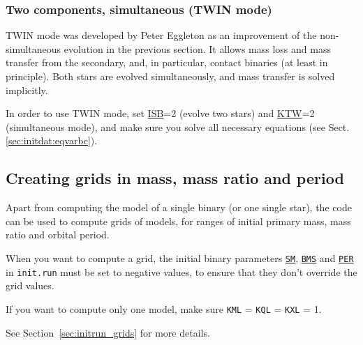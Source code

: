 \subsubsection{Two components, simultaneous (TWIN mode)}

TWIN mode was developed by Peter Eggleton as an improvement of the non-simultaneous evolution in the previous section.
It allows mass loss and mass transfer from the secondary, and, in particular, contact binaries (at least in principle).
Both stars are evolved simultaneously, and mass transfer is solved implicitly.  

In order to use TWIN mode, set \hyperlink{isb}{ISB}=2 (evolve two stars) and \hyperlink{ktw}{KTW}=2 (simultaneous mode),
and make sure you solve all necessary equations (see Sect.\,\ref{sec:initdat:eqvarbc}).



\subsection{Creating grids in mass, mass ratio and period}


Apart from computing the model of a single binary (or one single star), the code can be used to compute grids of models,
for ranges of initial primary mass, mass ratio and orbital period.  

When you want to compute a grid, the initial binary parameters \hyperlink{sm}{\texttt{SM}},
\hyperlink{bms}{\texttt{BMS}} and \hyperlink{per}{\texttt{PER}} in \texttt{init.run} must be set to negative 
values, to ensure that they don't override the grid values.

If you want to compute only one model, make sure \texttt{KML} = \texttt{KQL} = \texttt{KXL} = 1.

See Section~\ref{sec:initrun_grids} for more details.
